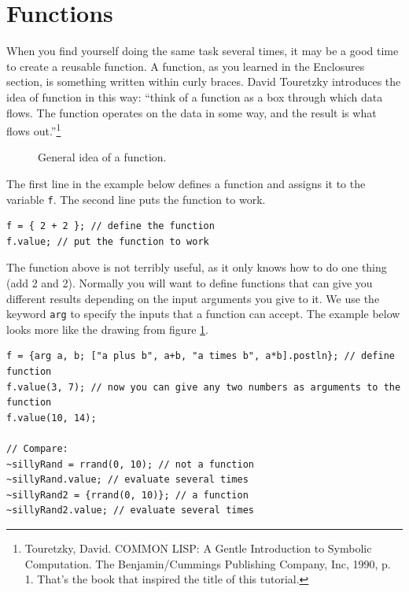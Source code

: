 \section{Functions}
\label{sec:functions}

When you find yourself doing the same task several times, it may be a good time to create a reusable function. A function, as you learned in the Enclosures section, is something written within curly braces. David Touretzky introduces the idea of function in this way: ``think of a function as a box through which data flows. The function operates on the data in some way, and the result is what flows out.''\footnote{Touretzky, David. COMMON LISP: A Gentle Introduction to Symbolic Computation. The Benjamin/Cummings Publishing Company, Inc, 1990, p. 1. That's the book that inspired the title of this tutorial.}

\begin{figure}[h]
\centerline{}
\caption{General idea of a function.}
\label{fig:function-box}
\end{figure}

The first line in the example below defines a function and assigns it to the variable \texttt{f}. The second line puts the function to work.
 
\begin{lstlisting}[style=SuperCollider-IDE, basicstyle=\scttfamily\footnotesize]
f = { 2 + 2 }; // define the function
f.value; // put the function to work
\end{lstlisting}
 
The function above is not terribly useful, as it only knows how to do one thing (add 2 and 2). Normally you will want to define functions that can give you different results depending on the input arguments you give to it. We use the keyword \texttt{arg} to specify the inputs that a function can accept. The example below looks more like the drawing from figure \ref{fig:function-box}.
 
\begin{lstlisting}[style=SuperCollider-IDE, basicstyle=\scttfamily\footnotesize]
f = {arg a, b; ["a plus b", a+b, "a times b", a*b].postln}; // define function
f.value(3, 7); // now you can give any two numbers as arguments to the function
f.value(10, 14);

// Compare:
~sillyRand = rrand(0, 10); // not a function
~sillyRand.value; // evaluate several times
~sillyRand2 = {rrand(0, 10)}; // a function
~sillyRand2.value; // evaluate several times
\end{lstlisting}
 

